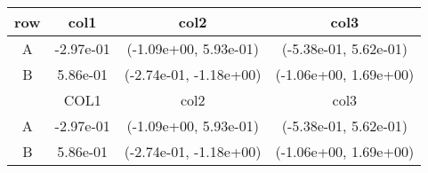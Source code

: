 \begin{tabular}{cccc}
\toprule
row&col1&col2&col3\tabularnewline
\midrule
A&-2.97e-01& (-1.09e+00, 5.93e-01)& (-5.38e-01, 5.62e-01)\tabularnewline
B&5.86e-01& (-2.74e-01, -1.18e+00)& (-1.06e+00, 1.69e+00)\tabularnewline
\midrule
&COL1&col2&col3\tabularnewline
\midrule
A&-2.97e-01& (-1.09e+00, 5.93e-01)& (-5.38e-01, 5.62e-01)\tabularnewline
B&5.86e-01& (-2.74e-01, -1.18e+00)& (-1.06e+00, 1.69e+00)\tabularnewline
\bottomrule
\end{tabular}
